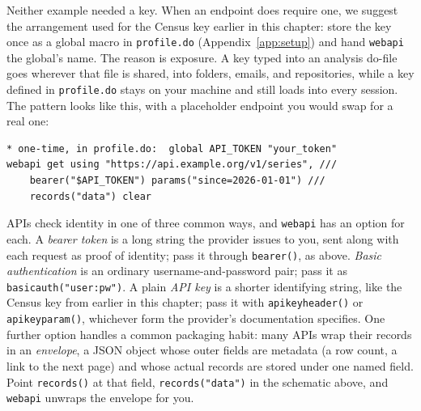 \documentclass[
    a4paper,
    fontsize=10pt,
    twoside=true,
    numbers=noenddot,
]{kaobook}
\begin{document}
Neither example needed a key. When an endpoint does require one, we suggest the arrangement used for the Census key earlier in this chapter: store the key once as a global macro in \texttt{profile.do} (Appendix~\ref{app:setup}) and hand \texttt{webapi} the global's name. The reason is exposure. A key typed into an analysis do-file goes wherever that file is shared, into folders, emails, and repositories, while a key defined in \texttt{profile.do} stays on your machine and still loads into every session. The pattern looks like this, with a placeholder endpoint you would swap for a real one:
\par
{\footnotesize
\begin{verbatim}
* one-time, in profile.do:  global API_TOKEN "your_token"
webapi get using "https://api.example.org/v1/series", ///
    bearer("$API_TOKEN") params("since=2026-01-01") ///
    records("data") clear
\end{verbatim}
}
APIs check identity in one of three common ways, and \texttt{webapi} has an option for each. A \emph{bearer token} is a long string the provider issues to you, sent along with each request as proof of identity; pass it through \texttt{bearer()}, as above. \emph{Basic authentication} is an ordinary username-and-password pair; pass it as \texttt{basicauth("user:pw")}. A plain \emph{API key} is a shorter identifying string, like the Census key from earlier in this chapter; pass it with \texttt{apikeyheader()} or \texttt{apikeyparam()}, whichever form the provider's documentation specifies. One further option handles a common packaging habit: many APIs wrap their records in an \emph{envelope}, a JSON object whose outer fields are metadata (a row count, a link to the next page) and whose actual records are stored under one named field. Point \texttt{records()} at that field, \texttt{records("data")} in the schematic above, and \texttt{webapi} unwraps the envelope for you.
\end{document}
